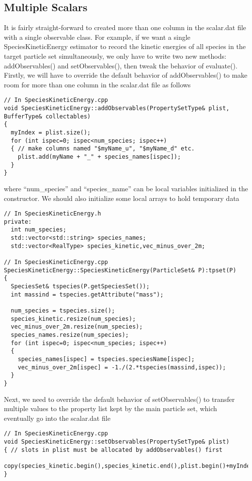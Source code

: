 \subsection{Multiple Scalars}
It is fairly straight-forward to created more than one column in the scalar.dat file with a single observable class. For example, if we want a single SpeciesKineticEnergy estimator to record the kinetic energies of all species in the target particle set simultaneously, we only have to write two new methods: addObservables() and setObservables(), then tweak the behavior of evaluate(). Firstly, we will have to override the default behavior of addObservables() to make room for more than one column in the scalar.dat file as follows
\begin{lstlisting}[style=C++]
// In SpeciesKineticEnergy.cpp
void SpeciesKineticEnergy::addObservables(PropertySetType& plist, BufferType& collectables)
{
  myIndex = plist.size();
  for (int ispec=0; ispec<num_species; ispec++)
  { // make columns named "$myName_u", "$myName_d" etc.
    plist.add(myName + "_" + species_names[ispec]);
  }
}
\end{lstlisting}
where ``num\_species'' and ``species\_name'' can be local variables initialized in the constructor. We should also initialize some local arrays to hold temporary data
\begin{lstlisting}
// In SpeciesKineticEnergy.h
private:
  int num_species;
  std::vector<std::string> species_names;
  std::vector<RealType> species_kinetic,vec_minus_over_2m;
  
// In SpeciesKineticEnergy.cpp
SpeciesKineticEnergy::SpeciesKineticEnergy(ParticleSet& P):tpset(P)
{
  SpeciesSet& tspecies(P.getSpeciesSet());
  int massind = tspecies.getAttribute("mass");

  num_species = tspecies.size();
  species_kinetic.resize(num_species);
  vec_minus_over_2m.resize(num_species);
  species_names.resize(num_species);
  for (int ispec=0; ispec<num_species; ispec++)
  {
    species_names[ispec] = tspecies.speciesName[ispec];
    vec_minus_over_2m[ispec] = -1./(2.*tspecies(massind,ispec));   
  }
}
\end{lstlisting}
Next, we need to override the default behavior of setObservables() to transfer multiple values to the property list kept by the main particle set, which eventually go into the scalar.dat file
\begin{lstlisting}[style=C++]
// In SpeciesKineticEnergy.cpp
void SpeciesKineticEnergy::setObservables(PropertySetType& plist)
{ // slots in plist must be allocated by addObservables() first
  copy(species_kinetic.begin(),species_kinetic.end(),plist.begin()+myIndex);
}
\end{lstlisting}
